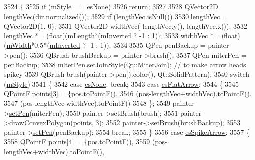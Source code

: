 \begin{DoxyCode}
3524 \{
3525   \textcolor{keywordflow}{if} (\hyperlink{class_q_c_p_line_ending_a4696fc9117b60f1ca7690fcd2ba56611}{mStyle} == \hyperlink{class_q_c_p_line_ending_a5ef16e6876b4b74959c7261d8d4c2cd5aca12d500f50cd6871766801bac30fb03}{esNone})
3526     \textcolor{keywordflow}{return};
3527   
3528   QVector2D lengthVec(dir.normalized());
3529   \textcolor{keywordflow}{if} (lengthVec.isNull())
3530     lengthVec = QVector2D(1, 0);
3531   QVector2D widthVec(-lengthVec.y(), lengthVec.x());
3532   lengthVec *= (float)(\hyperlink{class_q_c_p_line_ending_ae8e1e2566b96c05736cd92662dba8af8}{mLength}*(\hyperlink{class_q_c_p_line_ending_a91306fe771d54c955e0af21af14349d5}{mInverted} ? -1 : 1));
3533   widthVec *= (float)(\hyperlink{class_q_c_p_line_ending_aca89d21341133c20dc6825c33a5eac48}{mWidth}*0.5*(\hyperlink{class_q_c_p_line_ending_a91306fe771d54c955e0af21af14349d5}{mInverted} ? -1 : 1));
3534   
3535   QPen penBackup = painter->pen();
3536   QBrush brushBackup = painter->brush();
3537   QPen miterPen = penBackup;
3538   miterPen.setJoinStyle(Qt::MiterJoin); \textcolor{comment}{// to make arrow heads spikey}
3539   QBrush brush(painter->pen().color(), Qt::SolidPattern);
3540   \textcolor{keywordflow}{switch} (\hyperlink{class_q_c_p_line_ending_a4696fc9117b60f1ca7690fcd2ba56611}{mStyle})
3541   \{
3542     \textcolor{keywordflow}{case} \hyperlink{class_q_c_p_line_ending_a5ef16e6876b4b74959c7261d8d4c2cd5aca12d500f50cd6871766801bac30fb03}{esNone}: \textcolor{keywordflow}{break};
3543     \textcolor{keywordflow}{case} \hyperlink{class_q_c_p_line_ending_a5ef16e6876b4b74959c7261d8d4c2cd5a3d7dcea2f100671727c3417142154f8f}{esFlatArrow}:
3544     \{
3545       QPointF points[3] = \{pos.toPointF(),
3546                            (pos-lengthVec+widthVec).toPointF(),
3547                            (pos-lengthVec-widthVec).toPointF()
3548                           \};
3549       painter->\hyperlink{class_q_c_p_painter_af9c7a4cd1791403901f8c5b82a150195}{setPen}(miterPen);
3550       painter->setBrush(brush);
3551       painter->drawConvexPolygon(points, 3);
3552       painter->setBrush(brushBackup);
3553       painter->\hyperlink{class_q_c_p_painter_af9c7a4cd1791403901f8c5b82a150195}{setPen}(penBackup);
3554       \textcolor{keywordflow}{break};
3555     \}
3556     \textcolor{keywordflow}{case} \hyperlink{class_q_c_p_line_ending_a5ef16e6876b4b74959c7261d8d4c2cd5ab9964d0d03f812d1e79de15edbeb2cbf}{esSpikeArrow}:
3557     \{
3558       QPointF points[4] = \{pos.toPointF(),
3559                            (pos-lengthVec+widthVec).toPointF(),

\end{DoxyCode}
